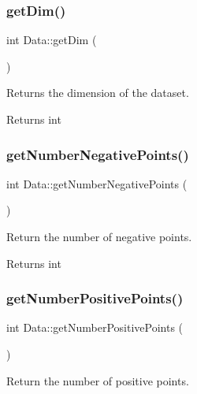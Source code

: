 \subsubsection{\texorpdfstring{get\+Dim()}{getDim()}}
{\footnotesize\ttfamily int Data\+::get\+Dim (\begin{DoxyParamCaption}{ }\end{DoxyParamCaption})}



Returns the dimension of the dataset. 

\begin{DoxyReturn}{Returns}
int 
\end{DoxyReturn}
\mbox{\label{class_data_a5166e74e946c2dbac75f383d63f018ea}} 
\subsubsection{\texorpdfstring{get\+Number\+Negative\+Points()}{getNumberNegativePoints()}}
{\footnotesize\ttfamily int Data\+::get\+Number\+Negative\+Points (\begin{DoxyParamCaption}{ }\end{DoxyParamCaption})}



Return the number of negative points. 

\begin{DoxyReturn}{Returns}
int 
\end{DoxyReturn}
\mbox{\label{class_data_a45a39ab2144bcdd0ac1aa67d7d08a6cc}} 
\subsubsection{\texorpdfstring{get\+Number\+Positive\+Points()}{getNumberPositivePoints()}}
{\footnotesize\ttfamily int Data\+::get\+Number\+Positive\+Points (\begin{DoxyParamCaption}{ }\end{DoxyParamCaption})}



Return the number of positive points. 

